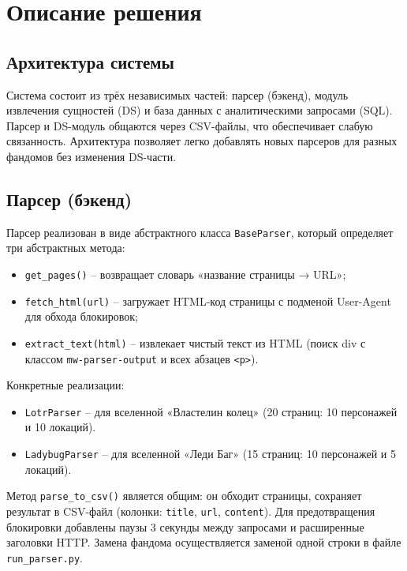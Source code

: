 \section{Описание решения}

\subsection{Архитектура системы}

Система состоит из трёх независимых частей: парсер (бэкенд), модуль извлечения сущностей (DS) и база данных с аналитическими запросами (SQL). Парсер и DS-модуль общаются через CSV-файлы, что обеспечивает слабую связанность. Архитектура позволяет легко добавлять новых парсеров для разных фандомов без изменения DS-части.

\subsection{Парсер (бэкенд)}

Парсер реализован в виде абстрактного класса \texttt{BaseParser}, который определяет три абстрактных метода:
\begin{itemize}
    \item \texttt{get\_pages()} – возвращает словарь «название страницы → URL»;
    \item \texttt{fetch\_html(url)} – загружает HTML-код страницы с подменой User-Agent для обхода блокировок;
    \item \texttt{extract\_text(html)} – извлекает чистый текст из HTML (поиск div с классом \texttt{mw-parser-output} и всех абзацев \texttt{<p>}).
\end{itemize}

Конкретные реализации:
\begin{itemize}
    \item \texttt{LotrParser} – для вселенной «Властелин колец» (20 страниц: 10 персонажей и 10 локаций).
    \item \texttt{LadybugParser} – для вселенной «Леди Баг» (15 страниц: 10 персонажей и 5 локаций).
\end{itemize}

Метод \texttt{parse\_to\_csv()} является общим: он обходит страницы, сохраняет результат в CSV-файл (колонки: \texttt{title}, \texttt{url}, \texttt{content}). Для предотвращения блокировки добавлены паузы 3 секунды между запросами и расширенные заголовки HTTP. Замена фандома осуществляется заменой одной строки в файле \texttt{run\_parser.py}.

